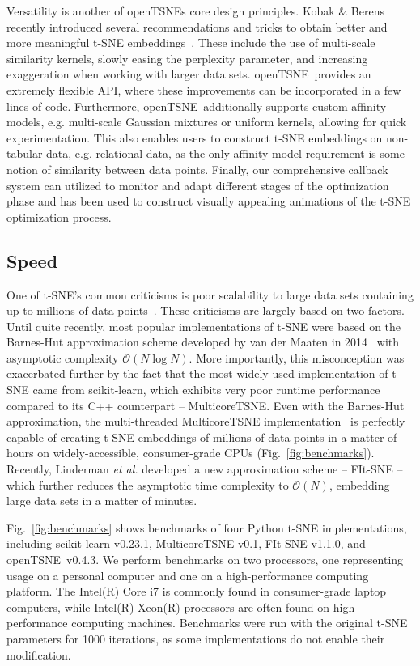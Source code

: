 \documentclass[twocolumn]{bmcart}
\newcommand{\opentsne}{\textsf{openTSNE}}
\begin{document}
Versatility is another of  \opentsne s core design principles. Kobak \& Berens recently introduced several recommendations and tricks to obtain better and more meaningful t-SNE embeddings~\cite{kobak2019art}. These include the use of multi-scale similarity kernels, slowly easing the perplexity parameter, and increasing exaggeration when working with larger data sets. \opentsne\ provides an extremely flexible API, where these improvements can be incorporated in a few lines of code. Furthermore, \opentsne\ additionally supports custom affinity models, e.g. multi-scale Gaussian mixtures or uniform kernels, allowing for quick experimentation. This also enables users to construct t-SNE embeddings on non-tabular data, e.g. relational data, as the only affinity-model requirement is some notion of similarity between data points. Finally, our comprehensive callback system can utilized to monitor and adapt different stages of the optimization phase and has been used to construct visually appealing animations of the t-SNE optimization process.

\subsection*{Speed}

One of t-SNE's common criticisms is poor scalability to large data sets containing up to millions of data points~\cite{becht2019dimensionality}. These criticisms are largely based on two factors. Until quite recently, most popular implementations of t-SNE were based on the Barnes-Hut approximation scheme developed by van der Maaten in 2014~\cite{van2014accelerating} with asymptotic complexity $\mathcal{O}(N \log N)$. More importantly, this misconception was exacerbated further by the fact that the most widely-used implementation of t-SNE came from \textsf{scikit-learn}, which exhibits very poor runtime performance compared to its C++ counterpart -- \textsf{MulticoreTSNE}. Even with the Barnes-Hut approximation, the multi-threaded \textsf{MulticoreTSNE} implementation~\cite{Ulyanov2016} is perfectly capable of creating t-SNE embeddings of millions of data points in a matter of hours on widely-accessible, consumer-grade CPUs (Fig.~\ref{fig:benchmarks}). Recently, Linderman \textit{et al.} developed a new approximation scheme -- FIt-SNE -- which further reduces the asymptotic time complexity to $\mathcal{O}(N)$, embedding large data sets in a matter of minutes.

Fig.~\ref{fig:benchmarks} shows benchmarks of four Python t-SNE implementations, including \textsf{scikit-learn} v0.23.1, \textsf{MulticoreTSNE} v0.1, \textsf{FIt-SNE} v1.1.0, and \opentsne\ v0.4.3. We perform benchmarks on two processors, one representing usage on a personal computer and one on a high-performance computing platform. The Intel(R) Core i7 is commonly found in consumer-grade laptop computers, while Intel(R) Xeon(R) processors are often found on high-performance computing machines. Benchmarks were run with the original t-SNE parameters for 1000 iterations, as some implementations do not enable their modification.
\end{document}
